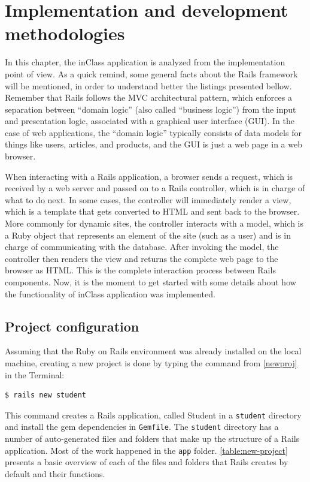 \section{Implementation and development methodologies}
In this chapter, the inClass application is analyzed from the implementation point of view. As a quick remind, some general facts about the Rails framework will be mentioned, in order to understand better the listings presented bellow. Remember that  Rails follows the MVC  architectural pattern, which enforces a separation between “domain logic” (also called “business logic”) from the input and presentation logic, associated with a graphical user interface (GUI). In the case of web applications, the “domain logic” typically consists of data models for things like users, articles, and products, and the GUI is just a web page in a web browser.

When interacting with a Rails application, a browser sends a request, which is received by a web server and passed on to a Rails controller, which is in charge of what to do next. In some cases, the controller will immediately render a view, which is a template that gets converted to HTML and sent back to the browser. More commonly for dynamic sites, the controller interacts with a model, which is a Ruby object that represents an element of the site (such as a user) and is in charge of communicating with the database. After invoking the model, the controller then renders the view and returns the complete web page to the browser as HTML. This is the complete interaction process between Rails components. Now, it is the moment to get started with some details about how the functionality of inClass application was implemented. 

\subsection{Project configuration}
Assuming that the Ruby on Rails environment was already installed on the local machine, creating a new project is done by typing the command from \autoref{newproj} in the Terminal:

\begin{lstlisting}[style=nonumbers, caption={Create new Rails project},label={newproj}]
$ rails new student
\end{lstlisting}
\bigskip

This command creates a Rails application, called Student in a \texttt{student} directory and install the gem dependencies in \texttt{Gemfile}. The \texttt{student} directory has a number of auto-generated files and folders that make up the structure of a Rails application. Most of the work happened in the \texttt{app} folder. \autoref{table:new-project} presents a basic overview of each of the files and folders that Rails creates by default and their functions.

